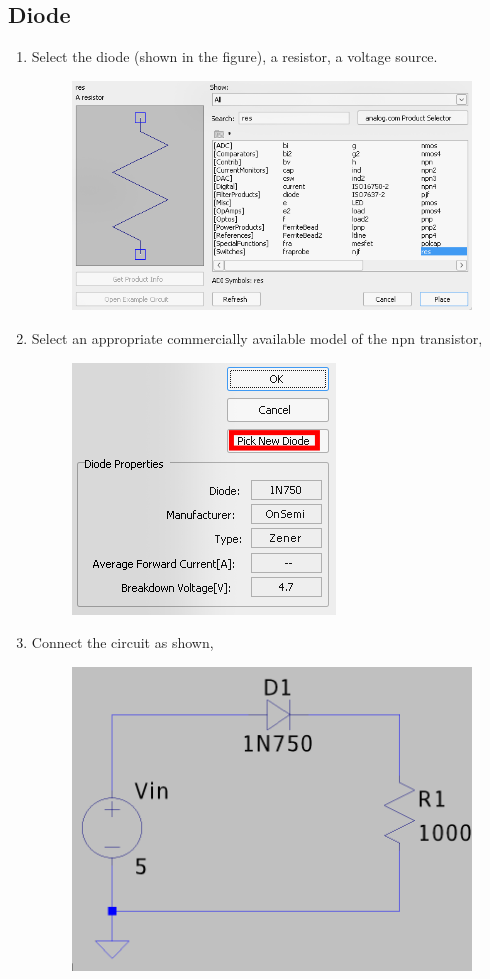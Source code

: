 \documentclass[12pt,a4paper]{report}
\begin{document}
\subsection{Diode}
\begin{enumerate}
    \item Select the diode (shown in the figure), a resistor, a voltage source.
    \begin{figure}[h!]
        \centering
        \includegraphics[width = 0.6\linewidth]{figs/component-diode.png}
        \label{fig:placeholder}
    \end{figure}
    \item Select an appropriate commercially available model of the npn transistor,
    \begin{figure}[h!]
        \centering
        \includegraphics[width=0.3\linewidth]{figs/diode-model.png}
        \label{fig:placeholder}
    \end{figure}
    \item Connect the circuit as shown,
    \begin{figure}[h!]
        \centering
        \includegraphics[width=0.5\linewidth]{figs/diode-circuit.png}
        \label{fig:placeholder}

\end{figure}
\end{enumerate}
\end{document}

